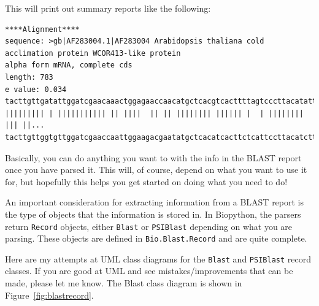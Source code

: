 \documentclass{report}
\begin{document}
This will print out summary reports like the following:

\begin{verbatim}
****Alignment****
sequence: >gb|AF283004.1|AF283004 Arabidopsis thaliana cold acclimation protein WCOR413-like protein
alpha form mRNA, complete cds
length: 783
e value: 0.034
tacttgttgatattggatcgaacaaactggagaaccaacatgctcacgtcacttttagtcccttacatattcctc...
||||||||| | ||||||||||| || ||||  || || |||||||| |||||| |  | |||||||| ||| ||...
tacttgttggtgttggatcgaaccaattggaagacgaatatgctcacatcacttctcattccttacatcttcttc...
\end{verbatim}

Basically, you can do anything you want to with the info in the BLAST
report once you have parsed it. This will, of course, depend on what
you want to use it for, but hopefully this helps you get started on
doing what you need to do!

An important consideration for extracting information from a BLAST report is the type of objects that the information is stored in. In Biopython, the parsers return \verb|Record| objects, either \verb|Blast| or \verb|PSIBlast| depending on what you are parsing. These objects are defined in \verb|Bio.Blast.Record| and are quite complete.

Here are my attempts at UML class diagrams for the \verb|Blast| and \verb|PSIBlast| record classes. If you are good at UML and see mistakes/improvements that can be made, please let me know. The Blast class diagram is shown in Figure~\ref{fig:blastrecord}.

\begin{htmlonly}
\label{fig:blastrecord}
\end{htmlonly}
\end{document}
